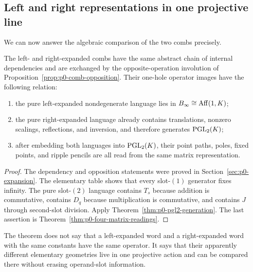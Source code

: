 \subsection{Left and right representations in one projective line}

We can now answer the algebraic comparison of the two combs precisely.

\begin{theorem}
\label{thm:p0-comb-projective-unification}
The left- and right-expanded combs have the same abstract chain of internal
dependencies and are exchanged by the opposite-operation involution of
Proposition~\ref{prop:p0-comb-opposition}.  Their one-hole operator images have
the following relation:

\begin{enumerate}
  \item the pure left-expanded nondegenerate language lies in
  $B_\infty\cong\operatorname{Aff}(1,K)$;

  \item the pure right-expanded language already contains translations,
  nonzero scalings, reflections, and inversion, and therefore generates
  $\operatorname{PGL}_2(K)$;

  \item after embedding both languages into $\operatorname{PGL}_2(K)$, their point paths,
  poles, fixed points, and ripple pencils are all read from the same matrix
  representation.
\end{enumerate}
\end{theorem}

\begin{proof}
The dependency and opposition statements were proved in
Section~\ref{sec:p0-expansion}.  The elementary table shows that every
slot-$(1)$ generator fixes infinity.  The pure slot-$(2)$ language contains
$T_s$ because addition is commutative, contains $D_q$ because multiplication
is commutative, and contains $J$ through second-slot division.  Apply
Theorem~\ref{thm:p0-pgl2-generation}.  The last assertion is
Theorem~\ref{thm:p0-four-matrix-readings}.
\end{proof}

The theorem does not say that a left-expanded word and a right-expanded word
with the same constants have the same operator.  It says that their apparently
different elementary geometries live in one projective action and can be
compared there without erasing operand-slot information.
